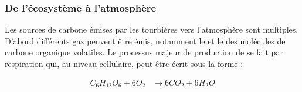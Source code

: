 \subsubsection{De l'écosystème à l'atmosphère}

Les sources de carbone émises par les tourbières vers l'atmosphère sont multiples.
D'abord différents gaz peuvent être émis, notamment le \coo et le \chh des molécules de carbone organique volatiles.
Le processus majeur de production de \coo se fait par respiration qui, au niveau cellulaire, peut être écrit sous la forme :

$$\begin{aligned}\label{eq:respi}
C_{6}H_{12}O_{6} + 6O_{2} &\rightarrow 6CO_{2} + 6H_{2}O \\
\end{aligned} $$

